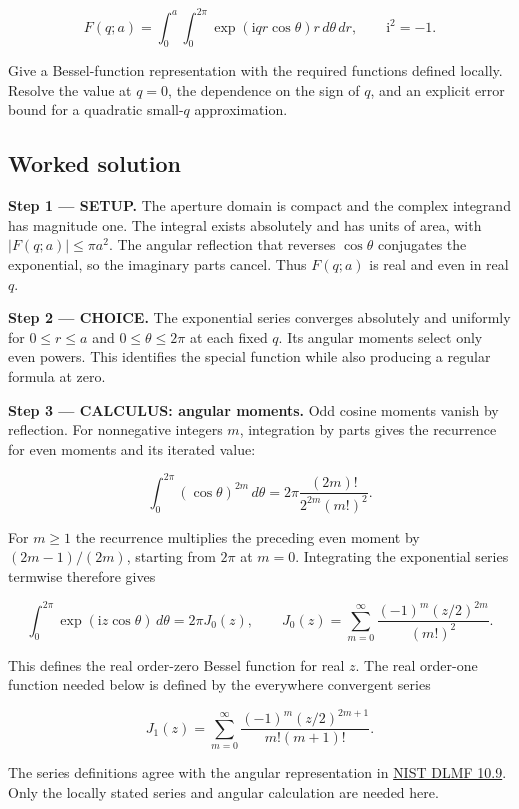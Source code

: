\documentclass[11pt,oneside,openany]{book}
\begin{document}
\[
F(q;a)=\int_0^a\int_0^{2\pi}\exp(\mathrm i q r\cos\theta)r\,d\theta\,dr,
\qquad \mathrm i^2=-1.
\]

Give a Bessel-function representation with the required functions defined locally. Resolve the value at \(q=0\), the dependence on the sign of \(q\), and an explicit error bound for a quadratic small-\(q\) approximation.
\subsection*{Worked solution}

\textbf{Step 1 --- SETUP.} The aperture domain is compact and the complex integrand has magnitude one. The integral exists absolutely and has units of area, with \(|F(q;a)|\le\pi a^2\). The angular reflection that reverses \(\cos\theta\) conjugates the exponential, so the imaginary parts cancel. Thus \(F(q;a)\) is real and even in real \(q\).

\begin{ChoiceStep}
\textbf{Step 2 --- CHOICE.} The exponential series converges absolutely and uniformly for \(0\le r\le a\) and \(0\le\theta\le2\pi\) at each fixed \(q\). Its angular moments select only even powers. This identifies the special function while also producing a regular formula at zero.

\end{ChoiceStep}
\textbf{Step 3 --- CALCULUS: angular moments.} Odd cosine moments vanish by reflection. For nonnegative integers \(m\), integration by parts gives the recurrence for even moments and its iterated value:

\[
\int_0^{2\pi}(\cos\theta)^{2m}\,d\theta
=2\pi\frac{(2m)!}{2^{2m}(m!)^2}.
\]

For \(m\ge1\) the recurrence multiplies the preceding even moment by \((2m-1)/(2m)\), starting from \(2\pi\) at \(m=0\). Integrating the exponential series termwise therefore gives

\[
\int_0^{2\pi}\exp(\mathrm i z\cos\theta)\,d\theta
=2\pi J_0(z),\qquad
J_0(z)=\sum_{m=0}^\infty\frac{(-1)^m(z/2)^{2m}}{(m!)^2}.
\]

This defines the real order-zero Bessel function for real \(z\). The real order-one function needed below is defined by the everywhere convergent series

\[
J_1(z)=\sum_{m=0}^\infty\frac{(-1)^m(z/2)^{2m+1}}{m!(m+1)!}.
\]

The series definitions agree with the angular representation in \href{https://dlmf.nist.gov/10.9}{NIST DLMF 10.9}. Only the locally stated series and angular calculation are needed here.
\end{document}
